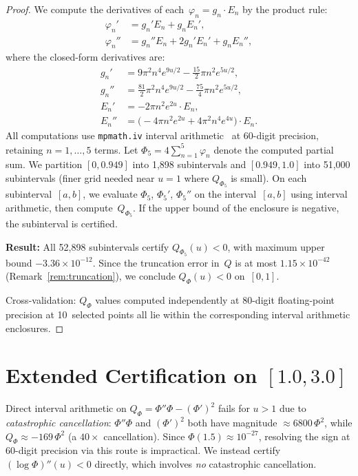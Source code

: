 \documentclass[11pt]{article}
\theoremstyle{definition}
\theoremstyle{remark}
\begin{document}
\begin{proof}
We compute the derivatives of each~$\varphi_n = g_n \cdot E_n$ by the product rule:
\begin{align*}
\varphi_n' &= g_n' E_n + g_n E_n', \\
\varphi_n'' &= g_n'' E_n + 2g_n' E_n' + g_n E_n'',
\end{align*}
where the closed-form derivatives are:
\begin{align*}
g_n' &= 9\pi^2 n^4 e^{9u/2} - \tfrac{15}{2}\pi n^2 e^{5u/2}, \\
g_n'' &= \tfrac{81}{2}\pi^2 n^4 e^{9u/2} - \tfrac{75}{4}\pi n^2 e^{5u/2}, \\
E_n' &= -2\pi n^2 e^{2u}\cdot E_n, \\
E_n'' &= \bigl(-4\pi n^2 e^{2u} + 4\pi^2 n^4 e^{4u}\bigr)\cdot E_n.
\end{align*}
All computations use \texttt{mpmath.iv} interval arithmetic~\cite{mpmath} at 60-digit precision, retaining $n = 1,\ldots,5$ terms. Let $\Phi_5 = 4\sum_{n=1}^{5}\varphi_n$ denote the computed partial sum. We partition $[0, 0.949]$ into 1{,}898 subintervals and $[0.949, 1.0]$ into 51{,}000 subintervals (finer grid needed near $u = 1$ where $Q_{\Phi_5}$ is small). On each subinterval~$[a,b]$, we evaluate $\Phi_5$, $\Phi_5'$, $\Phi_5''$ on the interval~$[a,b]$ using interval arithmetic, then compute~$Q_{\Phi_5}$. If the upper bound of the enclosure is negative, the subinterval is certified.

\textbf{Result:} All 52{,}898 subintervals certify $Q_{\Phi_5}(u) < 0$, with maximum upper bound $-3.36 \times 10^{-12}$. Since the truncation error in~$Q$ is at most $1.15 \times 10^{-42}$ (Remark~\ref{rem:truncation}), we conclude $Q_\Phi(u) < 0$ on~$[0,1]$.

Cross-validation: $Q_\Phi$ values computed independently at 80-digit floating-point precision at 10~selected points all lie within the corresponding interval arithmetic enclosures.
\end{proof}

\section{Extended Certification on $[1.0, 3.0]$}
\label{sec:extended}

Direct interval arithmetic on $Q_\Phi = \Phi''\Phi - (\Phi')^2$ fails for $u > 1$ due to
\emph{catastrophic cancellation}: $\Phi''\Phi$ and $(\Phi')^2$ both have magnitude
$\approx 6800\,\Phi^2$, while $Q_\Phi \approx -169\,\Phi^2$ (a $40\times$ cancellation).
Since $\Phi(1.5) \approx 10^{-27}$, resolving the sign at 60-digit precision via this
route is impractical. We instead certify $(\log\Phi)''(u) < 0$ directly, which involves
\emph{no} catastrophic cancellation.
\end{document}
